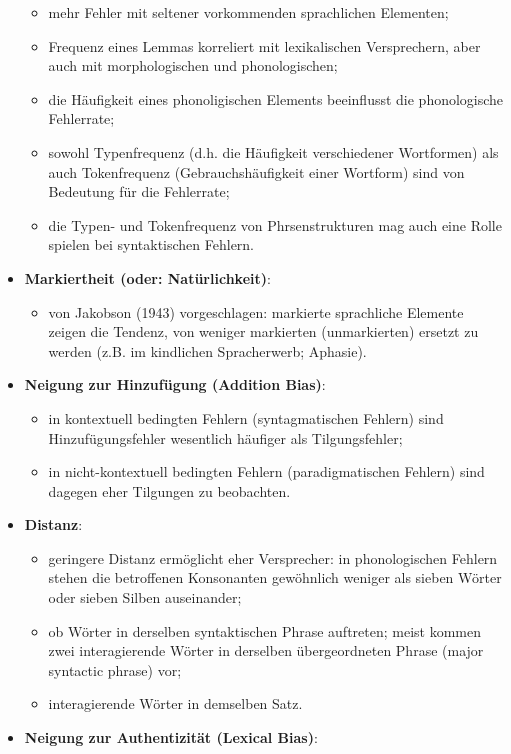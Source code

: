 \documentclass[
  letterpaper,
]{scrbook}
\providecommand{\tightlist}{%
  \setlength{\itemsep}{0pt}\setlength{\parskip}{0pt}}\usepackage{longtable,booktabs,array}
\begin{document}
\begin{itemize}
  \begin{itemize}
  \tightlist
  \item
    mehr Fehler mit seltener vorkommenden sprachlichen Elementen;
  \item
    Frequenz eines Lemmas korreliert mit lexikalischen Versprechern,
    aber auch mit morphologischen und phonologischen;
  \item
    die Häufigkeit eines phonoligischen Elements beeinflusst die
    phonologische Fehlerrate;
  \item
    sowohl Typenfrequenz (d.h. die Häufigkeit verschiedener Wortformen)
    als auch Tokenfrequenz (Gebrauchshäufigkeit einer Wortform) sind von
    Bedeutung für die Fehlerrate;
  \item
    die Typen- und Tokenfrequenz von Phrsenstrukturen mag auch eine
    Rolle spielen bei syntaktischen Fehlern.
  \end{itemize}
\item
  \textbf{Markiertheit (oder: Natürlichkeit)}:

  \begin{itemize}
  \tightlist
  \item
    von Jakobson (1943) vorgeschlagen: markierte sprachliche Elemente
    zeigen die Tendenz, von weniger markierten (unmarkierten) ersetzt zu
    werden (z.B. im kindlichen Spracherwerb; Aphasie).
  \end{itemize}
\item
  \textbf{Neigung zur Hinzufügung (Addition Bias)}:

  \begin{itemize}
  \tightlist
  \item
    in kontextuell bedingten Fehlern (syntagmatischen Fehlern) sind
    Hinzufügungsfehler wesentlich häufiger als Tilgungsfehler;
  \item
    in nicht-kontextuell bedingten Fehlern (paradigmatischen Fehlern)
    sind dagegen eher Tilgungen zu beobachten.
  \end{itemize}
\item
  \textbf{Distanz}:

  \begin{itemize}
  \tightlist
  \item
    geringere Distanz ermöglicht eher Versprecher: in phonologischen
    Fehlern stehen die betroffenen Konsonanten gewöhnlich weniger als
    sieben Wörter oder sieben Silben auseinander;
  \item
    ob Wörter in derselben syntaktischen Phrase auftreten; meist kommen
    zwei interagierende Wörter in derselben übergeordneten Phrase (major
    syntactic phrase) vor;
  \item
    interagierende Wörter in demselben Satz.
  \end{itemize}
\item
  \textbf{Neigung zur Authentizität (Lexical Bias)}:


\end{itemize}
\end{document}
